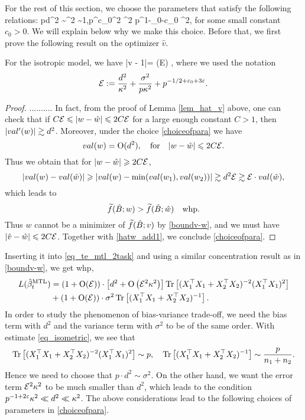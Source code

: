 For the rest of this section, we choose the parameters that satisfy the following relations: \be\label{choiceofpara}
pd^2 \sim \sigma^2 \sim 1,\quad p^{c_0}\kappa^2  \le \sigma^2 \le p^{1-\e_0-c_0} \kappa^2,
\ee
for some small constant $c_0>0$. We will explain below why we make this choice. Before that, we first prove the following result on the optimizer $\hat v$.
\begin{lemma}
For the isotropic model, we have
\be\label{hatv_add1} 
|\hat v - 1|= \OO\left(\cal E\right) \quad {}, \ee
where we used the notation
$$\cal E:=\frac{d^2}{\kappa^2} + \frac{\sigma^2}{p\kappa^2} + p^{-1/2 + \e_0 + 3\e}. $$
\end{lemma}
\begin{proof}
.......... In fact, from the proof of Lemma \ref{lem_hat_v} above, one can check that if $C\cal E \le |w-\hat w| \le 2C\cal E$ for a large enough constant $C>1$, then $|\val'(w)|\gtrsim d^2$. Moreover, under the choice \eqref{choiceofpara} we have 
$$\val(w) =\OO(d^2),\quad \text{for}\quad   |w-\hat w|\le 2C\cal E.$$  
Thus we obtain that for $|w-\hat w|\ge 2C\cal E$,
$$\left|\val(w) - \val(\hat w)\right|\ge |\val(w)-\min(\val(w_1),\val(w_2))|\gtrsim d^2 \cal E \gtrsim \cal E \cdot \val(\hat w),$$
which leads to 
$$\wt f(\hat B; w) > \wt f(\hat B; \hat w) \quad \text{whp}.$$
Thus $w$ cannot be a minimizer of $\wt f(\hat B; v) $ by \eqref{boundv-w}, and we must have $|\hat v - \hat w|\le 2C\cal E$. Together with \eqref{hatw_add1}, we conclude \eqref{choiceofpara}.
\end{proof}

Inserting it into \eqref{eq_te_mtl_2task} and using a similar concentration result as in \eqref{boundv-w}, we get whp,
\begin{align}
\te(\hat{\beta}_t^{\MTL})&=(1+\OO(\cal E))\cdot \left[d^2 + \OO\left(\cal E^2 \kappa^2\right)\right] \tr\left[(X_1^{\top}X_1 +X_2^{\top}X_2)^{-2} (X_1^{\top}X_1)^2\right]\nonumber\\ 
&+(1+\OO(\cal E))\cdot \sigma^2  \bigtr{(X_1^{\top}X_1  + X_2^{\top}X_2)^{-1} }. \nonumber
\end{align}
In order to study the phenomenon of bias-variance trade-off, we need the bias term with $d^2$ and the variance term with $\sigma^2$ to be of the same order. With estimate \eqref{eq_isometric}, we see that 
$$\tr\left[(X_1^{\top}X_1 +X_2^{\top}X_2)^{-2} (X_1^{\top}X_1)^2\right] \sim p,\quad \bigtr{(X_1^{\top}X_1  + X_2^{\top}X_2)^{-1} } \sim \frac{p}{n_1+n_2}.$$
Hence we need to choose that $p\cdot d^2 \sim \sigma^2$. On the other hand, we want the error term $\cal E^2 \kappa^2$ to be much smaller than $d^2$, which leads to the condition $p^{-1+2\e}\kappa^2  \ll d^2 \ll \kappa^2$. The above considerations lead to the following choices of parameters in \eqref{choiceofpara}.

